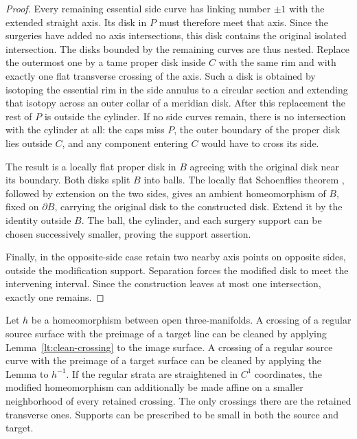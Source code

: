\begin{proof}
Every remaining essential side curve has linking number $\pm1$ with
the extended straight axis.  Its disk in $P$ must therefore meet that
axis.  Since the surgeries have added no axis intersections, this disk
contains the original isolated intersection.  The disks bounded by the
remaining curves are thus nested.  Replace the outermost one by a tame
proper disk inside $C$ with the same rim and with exactly one flat
transverse crossing of the axis.  Such a disk is obtained by isotoping
the essential rim in the side annulus to a circular section and
extending that isotopy across an outer collar of a meridian disk.
After this replacement the rest of $P$ is outside the cylinder.  If no
side curves remain, there is no intersection with the cylinder at all:
the caps miss $P$, the outer boundary of the proper disk lies outside
$C$, and any component entering $C$ would have to cross its side.

The result is a locally flat proper disk in $B$ agreeing with the
original disk near its boundary.  Both disks split $B$ into balls.
The locally flat Schoenflies theorem \cite[Theorem~4]{Brown1962},
followed by extension on the two
sides, gives an ambient homeomorphism of $B$, fixed on $\partial B$,
carrying the original disk to the constructed disk.  Extend it by the
identity outside $B$.  The ball, the cylinder, and each surgery support
can be chosen successively smaller, proving the support assertion.

Finally, in the opposite-side case retain two nearby axis points on
opposite sides, outside the modification support.  Separation forces
the modified disk to meet the intervening interval.  Since the
construction leaves at most one intersection, exactly one remains.
\end{proof}

\begin{corollary}
\label{lt:affine-crossing}
Let $h$ be a homeomorphism between open three-manifolds.  A crossing of
a regular source surface with the preimage of a target line can be
cleaned by applying Lemma~\ref{lt:clean-crossing} to the image surface.
A crossing of a regular source curve with the preimage of a target
surface can be cleaned by applying the Lemma to $h^{-1}$.
If the regular strata are straightened in $C^1$ coordinates, the
modified homeomorphism can additionally be made affine on a smaller
neighborhood of every retained crossing.  The only crossings there
are the retained transverse ones.  Supports can be prescribed to be
small in both the source and target.
\end{corollary}


